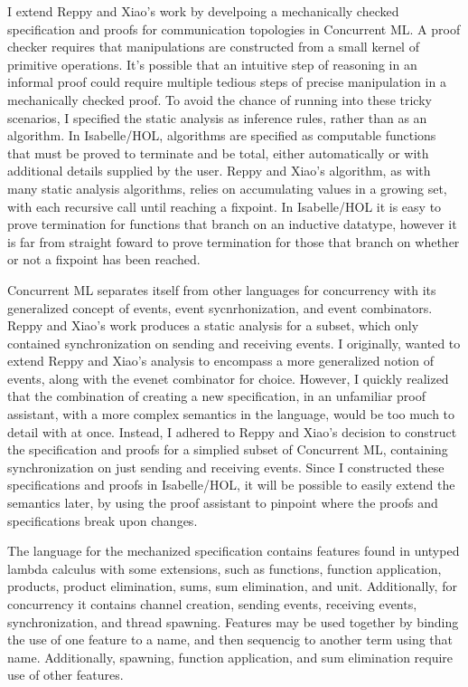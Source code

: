 \documentclass[letterpaper, 11pt]{extarticle}
\begin{document}
I extend Reppy and Xiao's work by develpoing a mechanically checked specification and proofs
for communication topologies in Concurrent ML. A proof checker requires that manipulations are
constructed from a small kernel of primitive operations. It's possible that an intuitive step of reasoning in an
informal proof could require multiple tedious steps of precise manipulation in a mechanically checked proof.
To avoid the chance of running into these tricky scenarios, I specified the static analysis
as inference rules, rather than as an algorithm. In Isabelle/HOL, algorithms are specified as computable functions
that must be proved to terminate and be total, either automatically or with additional details supplied by the user.
Reppy and Xiao's algorithm, as with many static analysis algorithms, relies on accumulating values in a growing set,
with each recursive call until reaching a fixpoint.
In Isabelle/HOL it is easy to prove termination for functions that branch on an inductive datatype, however
it is far from straight foward to prove termination for those that branch on
whether or not a fixpoint has been reached.

Concurrent ML separates itself from other languages for concurrency with its generalized concept of events,
event sycnrhonization, and event combinators.  Reppy and Xiao's work produces a static analysis for a subset,
which only contained synchronization on sending and receiving events.  I originally, wanted to extend Reppy and Xiao's
analysis to encompass a more generalized notion of events, along with the evenet combinator for choice.
However, I quickly
realized that the combination of creating a new specification, in an unfamiliar proof assistant, with a more complex
semantics in the language, would be too much to detail with at once.  Instead, I adhered to Reppy and Xiao's decision
to construct the specification and proofs for a simplied subset of Concurrent ML, containing synchronization on just
sending and receiving events. Since I constructed these specifications and proofs in Isabelle/HOL, it will be possible
to easily extend the semantics later, by using the proof assistant to pinpoint where the proofs and
specifications break upon changes.

The language for the mechanized specification contains features found in untyped lambda calculus with
some extensions, such as functions, function application, products, product elimination, sums, sum elimination, and unit. 
Additionally, for concurrency it contains channel creation, sending events, receiving events, synchronization,
and thread spawning. Features may be used together by binding the use of one feature to a name, and then
sequencig to another term using that name. Additionally, spawning, function application, and sum elimination require
use of other features.
\end{document}
